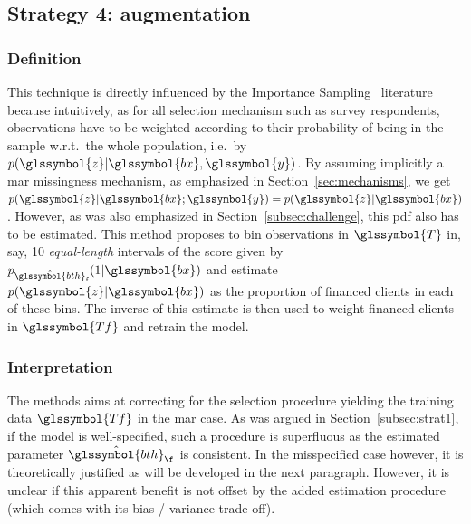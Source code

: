 \subsection{Strategy 4: augmentation} \label{subsec:augmentation}

\subsubsection{Definition}
This technique is directly influenced by the Importance Sampling~\cite{zadrozny2004learning} literature because intuitively, as for all selection mechanism such as survey respondents, observations have to be weighted according to their probability of being in the sample w.r.t.\ the whole population, i.e.\ by $p(\glssymbol{z} | \glssymbol{bx},\glssymbol{y})$. By assuming implicitly a \gls{mar} missingness mechanism, as emphasized in Section~\ref{sec:mechanisms}, we get $p(\glssymbol{z} | \glssymbol{bx}; \glssymbol{y}) = p(\glssymbol{z} | \glssymbol{bx})$. However, as was also emphasized in Section~\ref{subsec:challenge}, this \gls{pdf} also has to be estimated. This method proposes to bin observations in $\glssymbol{T}$ in, say, 10 \textit{equal-length} intervals of the \gls{score} given by $p_{\hat{\glssymbol{bth}}_\text{f}}(1 | \glssymbol{bx})$ and estimate $p(\glssymbol{z} | \glssymbol{bx})$ as the proportion of financed clients in each of these bins. The inverse of this estimate is then used to weight financed clients in $\glssymbol{Tf}$ and retrain the model.

\subsubsection{Interpretation}
The methods aims at correcting for the selection procedure yielding the training data $\glssymbol{Tf}$ in the \gls{mar} case. As was argued in Section~\ref{subsec:strat1}, if the model is well-specified, such a procedure is superfluous as the estimated parameter $\hat{\glssymbol{bth}}_{\f}$ is consistent. In the misspecified case however, it is theoretically justified as will be developed in the next paragraph. However, it is unclear if this apparent benefit is not offset by the added estimation procedure (which comes with its bias / variance trade-off).

